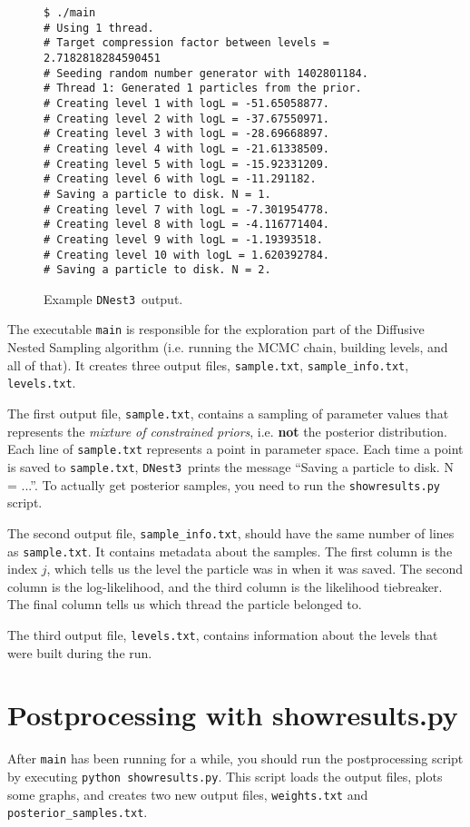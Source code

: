 \documentclass[a4paper, 11pt]{article}
\newcommand{\dnest}{{\tt DNest3}}
\begin{document}
\begin{figure}[h!]
\begin{verbatim}
$ ./main
# Using 1 thread.
# Target compression factor between levels = 2.7182818284590451
# Seeding random number generator with 1402801184.
# Thread 1: Generated 1 particles from the prior.
# Creating level 1 with logL = -51.65058877.
# Creating level 2 with logL = -37.67550971.
# Creating level 3 with logL = -28.69668897.
# Creating level 4 with logL = -21.61338509.
# Creating level 5 with logL = -15.92331209.
# Creating level 6 with logL = -11.291182.
# Saving a particle to disk. N = 1.
# Creating level 7 with logL = -7.301954778.
# Creating level 8 with logL = -4.116771404.
# Creating level 9 with logL = -1.19393518.
# Creating level 10 with logL = 1.620392784.
# Saving a particle to disk. N = 2.
\end{verbatim}
\caption{Example \dnest~output.\label{fig:output}}
\end{figure}

The executable {\tt main} is responsible for the exploration part of the
Diffusive Nested Sampling algorithm (i.e. running the MCMC chain, building
levels, and all of that). It creates three output files,
{\tt sample.txt}, {\tt sample\_info.txt}, {\tt levels.txt}.

The first output
file, {\tt sample.txt}, contains a sampling of parameter values that
represents the {\it mixture of constrained priors}, i.e. {\bf not} the
posterior distribution. Each line of {\tt sample.txt} represents a point in
parameter space. Each time a point is saved to {\tt sample.txt}, \dnest~prints
the message ``Saving a particle to disk. N = ...''. To actually get posterior
samples, you need to run the {\tt showresults.py} script.

The second output file, {\tt sample\_info.txt}, should have the same number of
lines as {\tt sample.txt}. It contains metadata about the samples. The first
column is the index $j$, which tells us the level the particle was in when it
was saved. The second column is the log-likelihood, and the third column is
the likelihood tiebreaker. The final column tells us which thread the particle
belonged to.

The third output file, {\tt levels.txt}, contains information about the levels
that were built during the run.

\section{Postprocessing with showresults.py}
After {\tt main} has been running for
a while, you should run the postprocessing script
by executing {\tt python showresults.py}. This script loads the output files,
plots some graphs, and creates two new output files, {\tt weights.txt} and
{\tt posterior\_samples.txt}.
\end{document}
